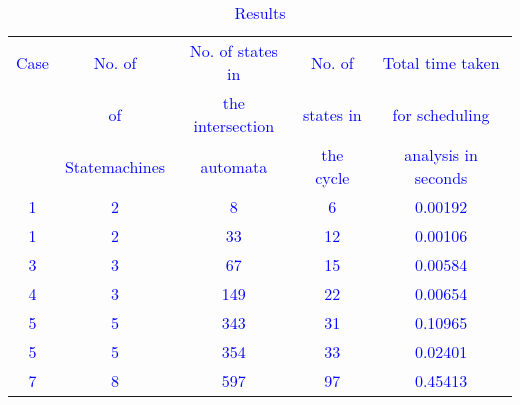 \begin{frame}
\begin{table}[ht]
\caption{{\textcolor{blue}{Results}}}
\centering
\begin{tabular}{|c | c | c | c | c |}
\hline %
\tiny{\textcolor{blue}{Case}} & \tiny{\textcolor{blue}{No. of}}           &  \tiny{\textcolor{blue}{No. of states in}}   & \tiny{\textcolor{blue}{No. of}}      & \tiny{\textcolor{blue}{Total time taken}}    \\
                             & \tiny{\textcolor{blue}{of}}               &  \tiny{\textcolor{blue}{the intersection}}   & \tiny{\textcolor{blue}{states in}}   & \tiny{\textcolor{blue}{for scheduling}}       \\  
                             & \tiny{\textcolor{blue}{Statemachines}}    &  \tiny{\textcolor{blue}{automata}}           & \tiny{\textcolor{blue}{the cycle}}   & \tiny{\textcolor{blue}{analysis in seconds}}   \\
\hline
\hline
\tiny{\textcolor{blue}{1}} & \tiny{\textcolor{blue}{2}} & \tiny{\textcolor{blue}{8}} & \tiny{\textcolor{blue}{6}} & \tiny{\textcolor{blue}{0.00192}}\\

\tiny{\textcolor{blue}{1}} & \tiny{\textcolor{blue}{2}}  & \tiny{\textcolor{blue}{33}} & \tiny{\textcolor{blue}{12}} &  \tiny{\textcolor{blue}{0.00106}} \\

\tiny{\textcolor{blue}{3}} & \tiny{\textcolor{blue}{3}}  & \tiny{\textcolor{blue}{67}} & \tiny{\textcolor{blue}{15}} & \tiny{\textcolor{blue}{0.00584}} \\

\tiny{\textcolor{blue}{4}} & \tiny{\textcolor{blue}{3}} & \tiny{\textcolor{blue}{149}} & \tiny{\textcolor{blue}{22}} & \tiny{\textcolor{blue}{0.00654}} \\

\tiny{\textcolor{blue}{5}} & \tiny{\textcolor{blue}{5}} & \tiny{\textcolor{blue}{343}} & \tiny{\textcolor{blue}{31}} & \tiny{\textcolor{blue}{0.10965}} \\

\tiny{\textcolor{blue}{5}} & \tiny{\textcolor{blue}{5}} & \tiny{\textcolor{blue}{354}} & \tiny{\textcolor{blue}{33}} & \tiny{\textcolor{blue}{0.02401}} \\

\tiny{\textcolor{blue}{7}} & \tiny{\textcolor{blue}{8}} & \tiny{\textcolor{blue}{597}} & \tiny{\textcolor{blue}{97}} & \tiny{\textcolor{blue}{0.45413}}\\


\end{tabular}
\end{table}
\end{frame}
